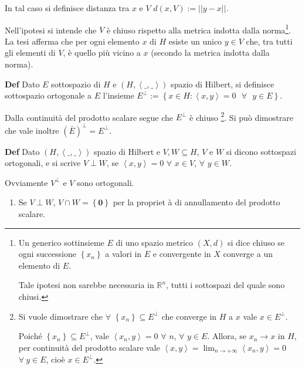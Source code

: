 \documentclass{article}
\begin{document}
In tal caso si definisce distanza tra $x$ e $V$ $d\left( x,V\right)
:=\left\vert \left\vert y-x\right\vert \right\vert $.

Nell'ipotesi si intende che $V$ \`{e} chiuso rispetto alla metrica indotta
dalla norma\footnote{%
Un generico sottinsieme $E$ di uno spazio metrico $\left( X,d\right) $ si
dice chiuso se ogni successione $\left\{ x_{n}\right\} $ a valori in $E$ e
convergente in $X$ converge a un elemento di $E$.
\par
Tale ipotesi non sarebbe necessaria in $%
\mathbb{R}
^{n}$, tutti i sottospazi del quale sono chiusi.}. La tesi afferma che per
ogni elemento $x$ di $H$ esiste un unico $y\in V$ che, tra tutti gli
elementi di $V$, \`{e} quello pi\`{u} vicino a $x$ (secondo la metrica
indotta dalla norma).

\textbf{Def} Dato $E$ sottospazio di $H$ e $\left( H,\left\langle
\_,\_\right\rangle \right) $ spazio di Hilbert, si definisce sottospazio
ortogonale a $E$ l'insieme $E^{\perp }:=\left\{ x\in H:\left\langle
x,y\right\rangle =0\text{ }\forall \text{ }y\in E\right\} $.

Dalla continuit\`{a} del prodotto scalare segue che $E^{\perp }$ \`{e} chiuso%
\footnote{%
Si vuole dimostrare che $\forall $ $\left\{ x_{n}\right\} \subseteq E^{\perp
}$ che converge in $H$ a $x$ vale $x\in E^{\perp }$.
\par
Poich\'{e} $\left\{ x_{n}\right\} \subseteq E^{\perp }$, vale $\left\langle
x_{n},y\right\rangle =0$ $\forall $ $n$, $\forall $ $y\in E$. Allora, se $%
x_{n}\rightarrow x$ in $H$, per continuit\`{a} del prodotto scalare vale $%
\left\langle x,y\right\rangle =\lim_{n\rightarrow +\infty }\left\langle
x_{n},y\right\rangle =0$ $\forall ~y\in E$, cio\`{e} $x\in E^{\perp }$.}. Si
pu\`{o} dimostrare che vale inoltre $\left( \bar{E}\right) ^{\perp
}=E^{\perp }$.

\textbf{Def} Dato $\left( H,\left\langle \_,\_\right\rangle \right) $ spazio
di Hilbert e $V,W\subseteq H$, $V$ e $W$ si dicono sottospazi ortogonali, e
si scrive $V\perp W$, se $\left\langle x,y\right\rangle =0$ $\forall $ $x\in
V$, $\forall $ $y\in W$.

Ovviamente $V^{\perp }$ e $V$ sono ortogonali.

\begin{enumerate}
\item Se $V\perp W$, $V\cap W=\left\{ \mathbf{0}\right\} $ per la propriet%
\`{a} di annullamento del prodotto scalare.
\end{enumerate}
\end{document}
